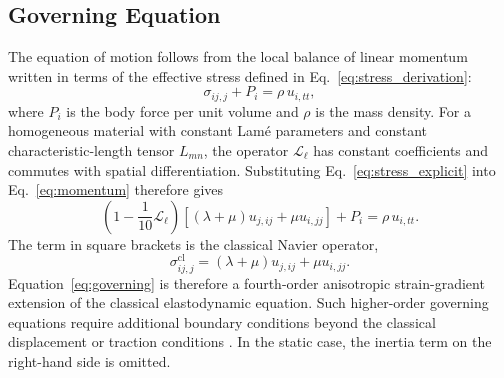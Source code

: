 \documentclass[final,3p,times,fleqn]{elsarticle}
\begin{document}
\subsection{Governing Equation}

The equation of motion follows from the local balance of linear momentum
written in terms of the effective stress defined in
Eq.~\eqref{eq:stress_derivation}:
\begin{equation}\label{eq:momentum}
\sigma_{ij,j}+P_i
=
\rho\,u_{i,tt},
\end{equation}
where $P_i$ is the body force per unit volume and $\rho$ is the mass
density. For a homogeneous material with constant Lamé parameters and
constant characteristic-length tensor $L_{mn}$, the operator
$\mathcal{L}_{\ell}$ has constant coefficients and commutes with spatial
differentiation. Substituting Eq.~\eqref{eq:stress_explicit} into
Eq.~\eqref{eq:momentum} therefore gives
\begin{equation}\label{eq:governing}
\left(1-\frac{1}{10}\mathcal{L}_{\ell}\right)
\left[
(\lambda+\mu)u_{j,ij}
+
\mu u_{i,jj}
\right]
+
P_i
=
\rho\,u_{i,tt}.
\end{equation}
The term in square brackets is the classical Navier operator,
\begin{equation}\label{eq:classical_navier}
\sigma_{ij,j}^{\mathrm{cl}}
=
(\lambda+\mu)u_{j,ij}
+
\mu u_{i,jj}.
\end{equation}
Equation~\eqref{eq:governing} is therefore a fourth-order anisotropic
strain-gradient extension of the classical elastodynamic equation. Such
higher-order governing equations require additional boundary conditions
beyond the classical displacement or traction conditions
\cite{Mindlin1964,Mindlin1965,AskesAifantis2011}. In the static case,
the inertia term on the right-hand side is omitted.
\end{document}
